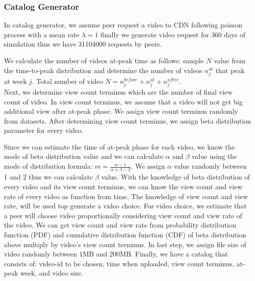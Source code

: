 \documentclass[10pt,final,journal,a4paper]{IEEEtran}
\begin{document}



\subsubsection{Catalog Generator}
In catalog generator, we assume peer request a video to CDN following poisson process with a mean rate $\lambda=1$ \cite{Zink:2009:CYN:1502814.1502987} %
finally we generate video request for 360 days of simulation thus we have 31104000 requests by peers. 


We calculate the number of videos at-peak time as follows: sample $N$ value from the time-to-peak distribution and determine the number of videos $n_j^{at}$ that peak at week $j$. 
Total number of video $N = n_j^{before} + n_j^{at} + n_j^{after}$.\\
Next, we determine view count terminus which are the number of final view count of video.
In view count terminus, we assume that a video will not get big additional view after at-peak phase.
We assign view count terminus randomly from datasets.
After determining view count terminus, we assign beta distribution parameter for every video. 

Since we can estimate the time of at-peak phase for each video, we know the mode of beta distribution value and we can calculate $\alpha$ and $\beta$ value using the mode of distribution formula: $m=\frac{\alpha-1}{\alpha + \beta - 2}$.  
We assign $\alpha$ value randomly between $1$ and $2$ thus we can calculate $\beta$ value.
With the knowledge of beta distribution of every video and its view count terminus, we can know the view count and view rate of every video as function from time.
The knowledge of view count and view rate, will be used top generate a video choice.  
For video choice, we estimate that a peer will choose video proportionally considering view count and view rate of the video.   
We can get view count and view rate from probability distribution function (PDF) and cumulative distribution function (CDF) of beta distribution above multiply by video's view count terminus.
In last step, we assign file size of video randomly between $1$MB and $200$MB.
Finally, we have a catalog that consists of: video-id to be chosen, time when uploaded, view count terminus, at-peak week, and video size.
\end{document}
